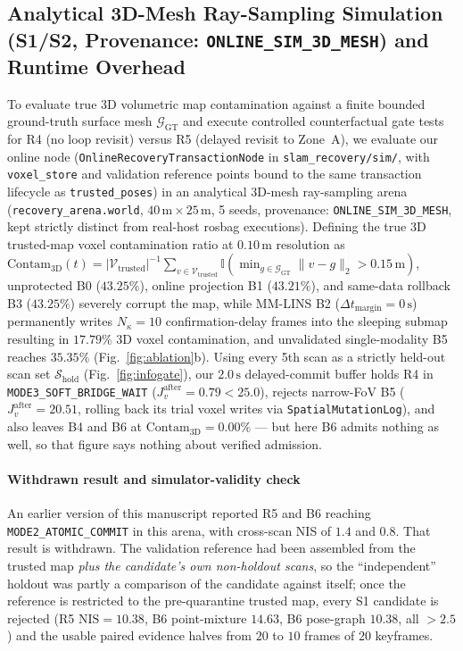 \documentclass[journal]{IEEEtran}
\begin{document}
\subsection{Analytical 3D-Mesh Ray-Sampling Simulation (S1/S2, Provenance: \texorpdfstring{\texttt{ONLINE\_SIM\_3D\_MESH}}{ONLINE\_SIM\_3D\_MESH}) and Runtime Overhead}
To evaluate true 3D volumetric map contamination against a finite bounded ground-truth surface mesh $\mathcal{G}_{\mathrm{GT}}$ and execute controlled counterfactual gate tests for R4 (no loop revisit) versus R5 (delayed revisit to Zone~A), we evaluate our online node (\texttt{OnlineRecoveryTransactionNode} in \texttt{slam\_recovery/sim/}, with \texttt{voxel\_store} and validation reference points bound to the same transaction lifecycle as \texttt{trusted\_poses}) in an analytical 3D-mesh ray-sampling arena (\texttt{recovery\_arena.world}, $40\,\mathrm{m}\times 25\,\mathrm{m}$, 5 seeds, provenance: \texttt{ONLINE\_SIM\_3D\_MESH}, kept strictly distinct from real-host rosbag executions). Defining the true 3D trusted-map voxel contamination ratio at $0.10\,\mathrm{m}$ resolution as $\mathrm{Contam}_{3\mathrm{D}}(t) = |\mathcal{V}_{\mathrm{trusted}}|^{-1}\sum_{v\in\mathcal{V}_{\mathrm{trusted}}} \mathbb{I}(\min_{g\in\mathcal{G}_{\mathrm{GT}}}\|v-g\|_2 > 0.15\,\mathrm{m})$, unprotected B0 ($43.25\%$), online projection B1 ($43.21\%$), and same-data rollback B3 ($43.25\%$) severely corrupt the map, while MM-LINS B2 ($\Delta t_{\mathrm{margin}}=0\,\mathrm{s}$) permanently writes $N_\kappa=10$ confirmation-delay frames into the sleeping submap resulting in $17.79\%$ 3D voxel contamination, and unvalidated single-modality B5 reaches $35.35\%$ (Fig.~\ref{fig:ablation}b). Using every 5th scan as a strictly held-out scan set $\mathcal{S}_{\mathrm{hold}}$ (Fig.~\ref{fig:infogate}), our $2.0\,\mathrm{s}$ delayed-commit buffer holds R4 in \texttt{MODE3\_SOFT\_BRIDGE\_WAIT} ($J_v^{\mathrm{after}}=0.79 < 25.0$), rejects narrow-FoV B5 ($J_v^{\mathrm{after}}=20.51$, rolling back its trial voxel writes via \texttt{SpatialMutationLog}), and also leaves B4 and B6 at $\mathrm{Contam}_{3\mathrm{D}} = 0.00\%$ --- but here B6 admits nothing as well, so that figure says nothing about verified admission.

\paragraph{Withdrawn result and simulator-validity check}
An earlier version of this manuscript reported R5 and B6 reaching \texttt{MODE2\_ATOMIC\_COMMIT} in this arena, with cross-scan NIS of $1.4$ and $0.8$. That result is withdrawn. The validation reference had been assembled from the trusted map \emph{plus the candidate's own non-holdout scans}, so the ``independent'' holdout was partly a comparison of the candidate against itself; once the reference is restricted to the pre-quarantine trusted map, every S1 candidate is rejected (R5 $\mathrm{NIS}=10.38$, B6 point-mixture $14.63$, B6 pose-graph $10.38$, all $>2.5$) and the usable paired evidence halves from $20$ to $10$ frames of $20$ keyframes.
\end{document}
